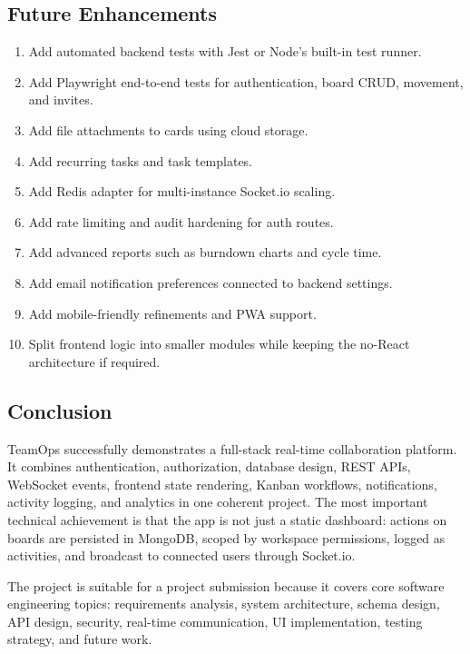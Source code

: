 \documentclass[
]{article}
\providecommand{\tightlist}{%
  \setlength{\itemsep}{0pt}\setlength{\parskip}{0pt}}
\begin{document}
\subsection{Future Enhancements}\label{future-enhancements}

\begin{enumerate}
\def\labelenumi{\arabic{enumi}.}
\tightlist
\item
  Add automated backend tests with Jest or Node's built-in test runner.
\item
  Add Playwright end-to-end tests for authentication, board CRUD,
  movement, and invites.
\item
  Add file attachments to cards using cloud storage.
\item
  Add recurring tasks and task templates.
\item
  Add Redis adapter for multi-instance Socket.io scaling.
\item
  Add rate limiting and audit hardening for auth routes.
\item
  Add advanced reports such as burndown charts and cycle time.
\item
  Add email notification preferences connected to backend settings.
\item
  Add mobile-friendly refinements and PWA support.
\item
  Split frontend logic into smaller modules while keeping the no-React
  architecture if required.
\end{enumerate}

\subsection{Conclusion}\label{conclusion}

TeamOps successfully demonstrates a full-stack real-time collaboration
platform. It combines authentication, authorization, database design,
REST APIs, WebSocket events, frontend state rendering, Kanban workflows,
notifications, activity logging, and analytics in one coherent project.
The most important technical achievement is that the app is not just a
static dashboard: actions on boards are persisted in MongoDB, scoped by
workspace permissions, logged as activities, and broadcast to connected
users through Socket.io.

The project is suitable for a project submission because it covers core
software engineering topics: requirements analysis, system architecture,
schema design, API design, security, real-time communication, UI
implementation, testing strategy, and future work.
\end{document}
